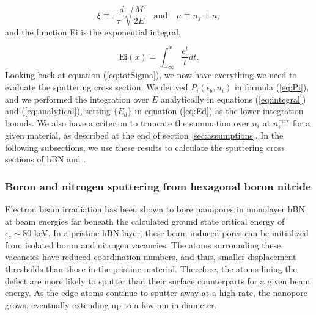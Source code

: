 \documentclass[twoside,twocolumn,9pt]{article}
\begin{document}
\begin{equation}
  \xi \equiv \frac{-d}{\tau} \sqrt{\frac{M}{2E}}
  \quad\text{and}\quad
  \mu \equiv n_f + n,
  \label{eq:xi}
\end{equation}
%
and the function Ei is the exponential integral,

\begin{equation}
  \text{Ei}(x) = \int_{-\infty}^x \frac{e^t}{t}dt.
  \label{eq:Ei}
\end{equation}
%
Looking back at equation (\ref{eq:totSigma}), we now have everything we need to
evaluate the sputtering cross section.
We derived $P_i(\epsilon_b, n_i)$ in formula (\ref{eq:Pi}), and we performed
the integration over $E$ analytically in equations (\ref{eq:integral}) and
(\ref{eq:analytical}), setting $\{E_d\}$ in equation (\ref{eq:Ed}) as the lower
integration bounds.
We also have a criterion to truncate the summation over $n_i$ at
$n_i^\text{max}$ for a given material, as described at the end of section
\ref{sec:assumptions}.
In the following subsections, we use these results to calculate the sputtering
cross sections of hBN and .


\subsubsection{Boron and nitrogen sputtering from hexagonal boron nitride}
\label{sec:hBN}

Electron beam irradiation has been shown to bore nanopores in monolayer hBN at
beam energies far beneath the calculated ground state critical energy of
$\epsilon_c\sim80$ keV.\cite{Jin2009,Meyer2009,Kotakoski2010,Cretu2015}
In a pristine hBN layer, these beam-induced pores can be initialized from
isolated boron and nitrogen vacancies.
The atoms surrounding these vacancies have reduced coordination numbers, and
thus, smaller displacement thresholds than those in the pristine material.
Therefore, the atoms lining the defect are more likely to sputter than their
surface counterparts for a given beam energy.
As the edge atoms continue to sputter away at a high rate, the nanopore grows,
eventually extending up to a few nm in diameter.
\cite{Meyer2009,Cretu2015,Dogan2020}
\end{document}
